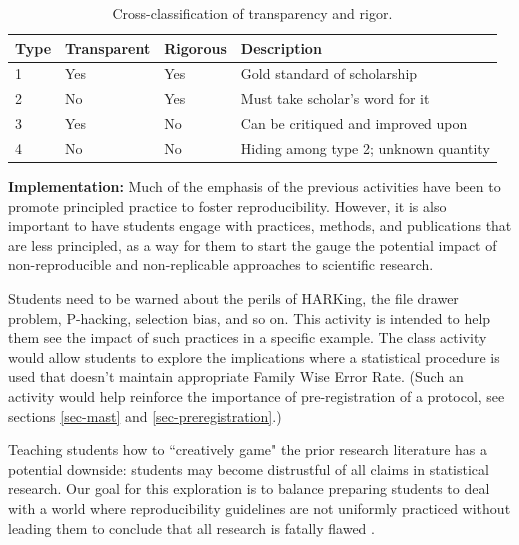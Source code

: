 \documentclass[
  12pt]{article}
\begin{document}
\begin{table}[!ht]
    \centering
    \begin{tabular}{llll}
    \hline
        Type & Transparent & Rigorous & Description \\  \hline
        1 & Yes & Yes & Gold standard of scholarship \\ \hline
        2 & No & Yes & Must take scholar’s word for it \\ \hline
        3 & Yes & No & Can be critiqued and improved upon \\ \hline
        4 & No & No & Hiding among type 2; unknown quantity \\ \hline
    \end{tabular}
    \caption{Cross-classification of transparency and rigor.}
    \label{table:transparency}
\end{table}

\textbf{Implementation:}
Much of the emphasis of the previous activities have been to promote principled practice to foster reproducibility.
However, it is also important to have students engage with practices, methods, and publications that are less principled, as a way for them to start the gauge the potential impact of non-reproducible and non-replicable approaches to scientific research.

Students need to be warned about the perils of HARKing, the file drawer problem, P-hacking, selection bias, and so on.
This activity is intended to help them see the impact of such practices in a specific example.
The class activity would allow students to explore the implications where a statistical procedure is used that doesn't maintain appropriate Family Wise Error Rate.
(Such an activity would help reinforce the importance of pre-registration of a protocol, see sections \ref{sec-mast} and \ref{sec-preregistration}.)

Teaching students how to ``creatively game" the prior research literature has a potential downside: students may become distrustful of all claims in statistical research. 
Our goal for this exploration is to balance preparing students to deal with a world where reproducibility guidelines are not uniformly practiced without leading them to conclude that all research is fatally flawed \citep{edmans}.
\end{document}
